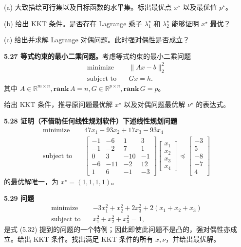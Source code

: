 \documentclass[UTF8, 12pt, fontset=fandol, oneside]{ctexart}
\begin{document}
(a) 大致描绘可行集以及目标函数的水平集。标出最优点 $x^\star$ 以及最优值 $p^\star$。

(b) 给出 KKT 条件。是否存在 Lagrange 乘子 $\lambda_1^\star$ 和 $\lambda_2^\star$ 能够证明 $x^\star$ 最优？

(c) 给出并求解 Lagrange 对偶问题。此时强对偶性是否成立？

\noindent\textbf{5.27 等式约束的最小二乘问题。}\quad 考虑等式约束的最小二乘问题
\[
\begin{aligned}
\text{minimize}\quad & \|Ax-b\|_2^2\\
\text{subject to}\quad & Gx=h.
\end{aligned}
\]
其中 $A\in\mathbb{R}^{m\times n}, \mathbf{rank}\,A=n, G\in\mathbb{R}^{p\times n}, \mathbf{rank}\,G=p$。

给出 KKT 条件，推导原问题最优解 $x^\star$ 以及对偶问题最优解 $\nu^\star$ 的表达式。

\noindent\textbf{5.28 证明（不借助任何线性规划软件）下述线性规划问题}
\[
\begin{aligned}
\text{minimize}\quad & 47x_1+93x_2+17x_3-93x_4\\
\text{subject to}\quad &
\begin{bmatrix}
-1 & -6 & 1 & 3\\
-1 & -2 & 7 & 1\\
0 & 3 & -10 & -1\\
-6 & -11 & -2 & 12\\
1 & 6 & -1 & -3
\end{bmatrix}
\begin{bmatrix}
x_1\\
x_2\\
x_3\\
x_4
\end{bmatrix}
\preceq
\begin{bmatrix}
-3\\
5\\
-8\\
-7\\
4
\end{bmatrix}
\end{aligned}
\]
的最优解唯一，为 $x^\star=(1,1,1,1)$。

\noindent\textbf{5.29 问题}
\[
\begin{aligned}
\text{minimize}\quad & -3x_1^2+x_2^2+2x_3^2+2(x_1+x_2+x_3)\\
\text{subject to}\quad & x_1^2+x_2^2+x_3^2=1,
\end{aligned}
\]
是式 (5.32) 提到的问题的一个特例；因此即使此问题不是凸的，强对偶性亦成立。给出 KKT 条件。找出满足 KKT 条件的所有 $x,\nu$，并给出最优解。
\end{document}
